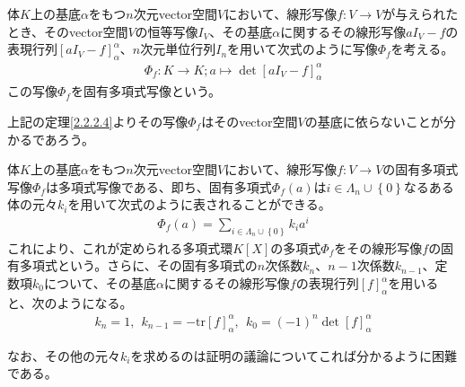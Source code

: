 \documentclass[dvipdfmx]{jsarticle}
\begin{document}
\begin{dfn}
体$K$上の基底$\alpha$をもつ$n$次元vector空間$V$において、線形写像$f:V \rightarrow V$が与えられたとき、そのvector空間$V$の恒等写像$I_{V}$、その基底$\alpha$に関するその線形写像$aI_{V} - f$の表現行列$\left[ aI_{V} - f \right]_{\alpha}^{\alpha}$、$n$次元単位行列$I_{n}$を用いて次式のように写像$\varPhi_{f}$を考える。
\begin{align*}
\varPhi_{f}:K \rightarrow K;a \mapsto \det\left[ aI_{V} - f \right]_{\alpha}^{\alpha}
\end{align*}
この写像$\varPhi_{f}$を固有多項式写像という。
\end{dfn}\par
上記の定理\ref{2.2.2.4}よりその写像$\varPhi_{f}$はそのvector空間$V$の基底に依らないことが分かるであろう。
\begin{thm}\label{2.2.2.5}
体$K$上の基底$\alpha$をもつ$n$次元vector空間$V$において、線形写像$f:V \rightarrow V$の固有多項式写像$\varPhi_{f}$は多項式写像である、即ち、固有多項式$\varPhi_{f}(a)$は$i \in \varLambda_{n} \cup \left\{ 0 \right\}$なるある体の元々$k_{i}$を用いて次式のように表されることができる。
\begin{align*}
\varPhi_{f}(a) = \sum_{i \in \varLambda_{n} \cup \left\{ 0 \right\}} {k_{i}a^{i}}
\end{align*}
これにより、これが定められる多項式環$K[ X]$の多項式$\varPhi_{f}$をその線形写像$f$の固有多項式という。さらに、その固有多項式の$n$次係数$k_{n}$、$n - 1$次係数$k_{n - 1}$、定数項$k_{0}$について、その基底$\alpha$に関するその線形写像$f$の表現行列$[ f]_{\alpha}^{\alpha}$を用いると、次のようになる。
\begin{align*}
k_{n} = 1,\ \ k_{n - 1} = - {\mathrm{tr} }[ f]_{\alpha}^{\alpha},\ \ k_{0} = ( - 1)^{n}\det[ f]_{\alpha}^{\alpha}
\end{align*}
\end{thm}\par
なお、その他の元々$k_{i}$を求めるのは証明の議論についてこれば分かるように困難である。
\end{document}
